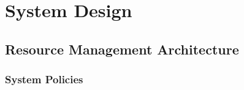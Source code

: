 \section{System Design}
\subsection{Resource Management Architecture}
\subsubsection{System Policies}